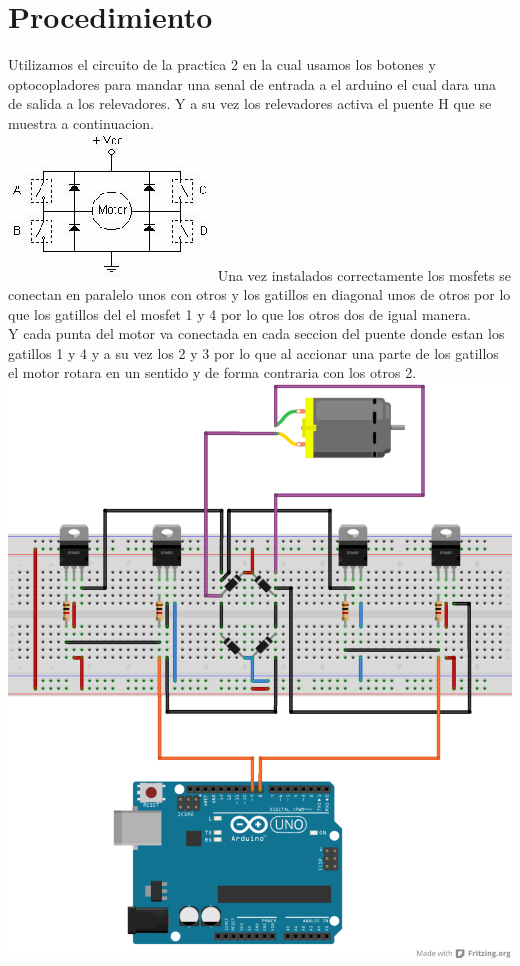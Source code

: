 \documentclass[12pt,a4paper]{report}
\begin{document}
\section{Procedimiento}
Utilizamos el circuito de la practica 2 en la cual usamos los botones y optocopladores para mandar una senal de entrada a el arduino el cual dara una de salida a los relevadores.
Y a su vez los relevadores activa el puente H que se muestra a continuacion.
\\
\includegraphics[scale=1]{esquematico.png} 
Una vez instalados correctamente los mosfets se conectan en paralelo unos con otros y los gatillos en diagonal unos de otros por lo que los gatillos del el mosfet 1 y 4 por lo que los otros dos de igual manera.\\
Y cada punta del motor va conectada en cada seccion del puente donde estan los gatillos 1 y 4 y a su vez los 2 y 3 por lo que al accionar una parte de los gatillos el motor rotara en un sentido y de forma contraria con los otros 2.
\\
\includegraphics[scale=1]{arduino.png}\\ 
\end{document}
